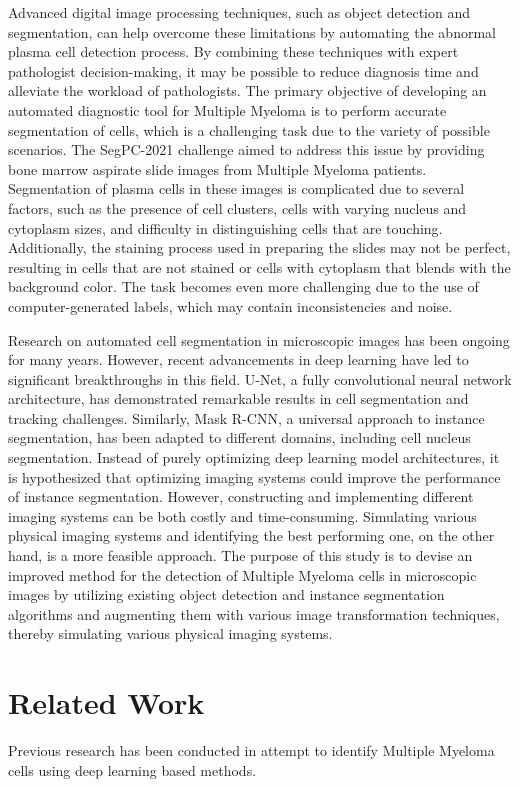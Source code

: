 \documentclass{article}
\begin{document}
Advanced digital image processing techniques, such as object detection and segmentation, can help overcome these limitations by automating the abnormal plasma cell detection process. By combining these techniques with expert pathologist decision-making, it may be possible to reduce diagnosis time and alleviate the workload of pathologists. The primary objective of developing an automated diagnostic tool for Multiple Myeloma is to perform accurate segmentation of cells, which is a challenging task due to the variety of possible scenarios. The SegPC-2021 challenge aimed to address this issue by providing bone marrow aspirate slide images from Multiple Myeloma patients. Segmentation of plasma cells in these images is complicated due to several factors, such as the presence of cell clusters, cells with varying nucleus and cytoplasm sizes, and difficulty in distinguishing cells that are touching. Additionally, the staining process used in preparing the slides may not be perfect, resulting in cells that are not stained or cells with cytoplasm that blends with the background color. The task becomes even more challenging due to the use of computer-generated labels, which may contain inconsistencies and noise.

Research on automated cell segmentation in microscopic images has been ongoing for many years. However, recent advancements in deep learning have led to significant breakthroughs in this field. U-Net, a fully convolutional neural network architecture, has demonstrated remarkable results in cell segmentation and tracking challenges. Similarly, Mask R-CNN, a universal approach to instance segmentation, has been adapted to different domains, including cell nucleus segmentation. Instead of purely optimizing deep learning model architectures, it is hypothesized that optimizing imaging systems could improve the performance of instance segmentation. However, constructing and implementing different imaging systems can be both costly and time-consuming. Simulating various physical imaging systems and identifying the best performing one, on the other hand, is a more feasible approach. The purpose of this study is to devise an improved method for the detection of Multiple Myeloma cells in microscopic images by utilizing existing object detection and instance segmentation algorithms and augmenting them with various image transformation techniques, thereby simulating various physical imaging systems.

\section{Related Work}
Previous research has been conducted in attempt to identify Multiple Myeloma cells using deep learning based methods.
\end{document}
